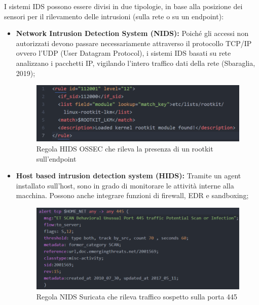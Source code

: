 I sistemi IDS possono essere divisi in due tipologie, in base alla posizione dei sensori per il rilevamento delle intrusioni (sulla rete o su un endpoint):


\begin{itemize}
    \item\textbf{Network Intrusion Detection System (NIDS):} Poiché gli accessi non autorizzati devono passare necessariamente attraverso il protocollo TCP/IP ovvero l’UDP (User Datagram Protocol), i sistemi IDS basati su rete analizzano i pacchetti IP, vigilando l’intero traffico dati della rete (Sbaraglia, 2019);
    \begin{figure}[h]
    \begin{center}
    \includegraphics[width=0.95\columnwidth]{images/2_architettura_img/HIDSRule.png}
    \end{center}
    \caption{Regola HIDS OSSEC che rileva la presenza di un rootkit sull’endpoint}
    \label{fig:Regola HIDS OSSEC che rileva la presenza di un rootkit sull’endpoint}
    \end{figure}
    
    \item\textbf{Host based intrusion detection system (HIDS):} Tramite un agent installato sull’host, sono in grado di monitorare le attività interne alla macchina. Possono anche integrare funzioni di firewall, EDR e sandboxing; 
    \begin{figure}[h]
    \begin{center}
    \includegraphics[width=0.95\columnwidth]{images/2_architettura_img/suricataRule.png}
    \end{center}
    \caption{Regola NIDS Suricata che rileva traffico sospetto sulla porta 445}
    \label{fig:Regola NIDS Suricata che rileva traffico sospetto sulla porta 445}
    \end{figure}
    
\end{itemize}

